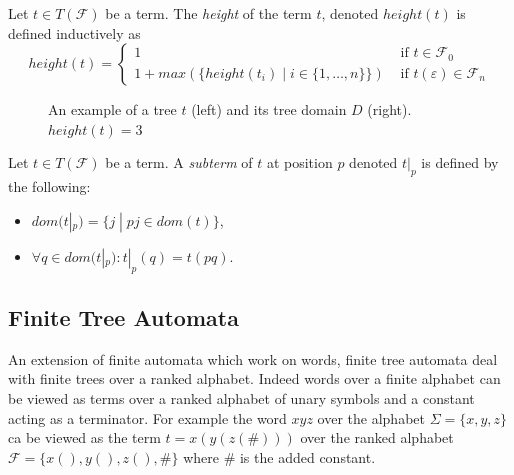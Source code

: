 \begin{defn}
Let $t \in T(\mathcal{F})$ be a term. The \emph{height} of the term $t$, denoted $height(t)$ is defined inductively as
\begin{equation*}
    height(t) = 
    \begin{cases}
        1 & \text{ if } t \in \mathcal{F}_0\\
        1 + max(\{height(t_i) \; | \; i \in \{1, \dots, n\}\}) & \text{ if } t(\varepsilon) \in \mathcal{F}_n
    \end{cases}
\end{equation*}
\end{defn}

\begin{figure}[H]
    \centering
    \caption{An example of a tree $t$ (left) and its tree domain $D$ (right). $height(t) = 3$}
    \label{fig_tree_domain}
\end{figure}

\begin{defn}
Let $t \in T(\mathcal{F})$ be a term. A \emph{subterm} of $t$ at position $p$ denoted $t|_p$ is defined by the following:
\begin{itemize}
    \item $dom(t|_p) = \{j \; | \; pj \in dom(t)\}$,
    \item $\forall q \in dom(t|_p): t|_p(q) = t(pq)$.
\end{itemize}
\end{defn}

\subsection{Finite Tree Automata}
An extension of finite automata which work on words, finite tree automata deal with finite trees over a ranked alphabet. Indeed words over a finite alphabet can be viewed as terms over a ranked alphabet of unary symbols and a constant acting as a terminator. For example the word $xyz$ over the alphabet $\Sigma = \{x,y,z\}$ ca be viewed as the term $t = x(y(z(\#)))$ over the ranked alphabet $\mathcal{F} = \{x(), y(), z(), \#\}$ where $\#$ is the added constant.

